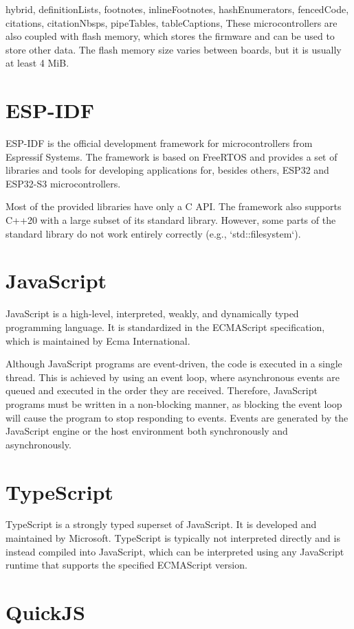 \begin{markdown*}{%
  hybrid,
  definitionLists,
  footnotes,
  inlineFootnotes,
  hashEnumerators,
  fencedCode,
  citations,
  citationNbsps,
  pipeTables,
  tableCaptions,
}
These microcontrollers are also coupled with flash memory, which stores the firmware and can be used to store other data. The flash memory size varies between boards, but it is usually at least 4 MiB.

\section{ESP-IDF}

ESP-IDF is the official development framework for microcontrollers from Espressif Systems. The framework is based on FreeRTOS and provides a set of libraries and tools for developing applications for, besides others, ESP32 and ESP32-S3 microcontrollers.

Most of the provided libraries have only a C API. The framework also supports C++20 with a large subset of its standard library. However, some parts of the standard library do not work entirely correctly (e.g., `std::filesystem`).

\section{JavaScript}

JavaScript is a high-level, interpreted, weakly, and dynamically typed programming language. It is standardized in the ECMAScript specification, which is maintained by Ecma International.

Although JavaScript programs are event-driven, the code is executed in a single thread. This is achieved by using an event loop, where asynchronous events are queued and executed in the order they are received. Therefore, JavaScript programs must be written in a non-blocking manner, as blocking the event loop will cause the program to stop responding to events. Events are generated by the JavaScript engine or the host environment both synchronously and asynchronously.

\section{TypeScript}

TypeScript is a strongly typed superset of JavaScript. It is developed and maintained by Microsoft. TypeScript is typically not interpreted directly and is instead compiled into JavaScript, which can be interpreted using any JavaScript runtime that supports the specified ECMAScript version.

\section{QuickJS}


\end{markdown*}
